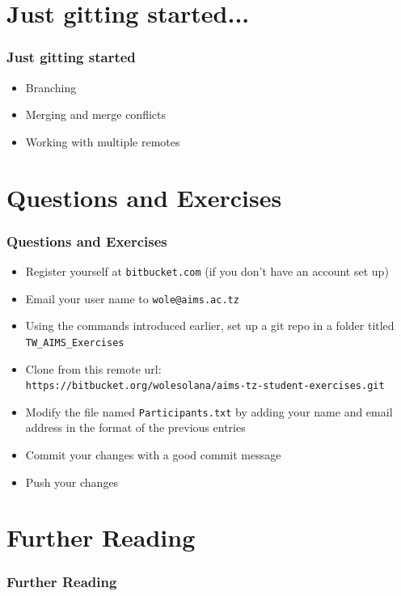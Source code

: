 \documentclass[10pt,t,sans,mathsans,xcolor=dvipsnames]{beamer}
\begin{document}
\section{Just gitting started...}
\begin{frame}[fragile]%
\frametitle{Just gitting started}
\pause
\begin{itemize}[<+->]
\item Branching
\item Merging and merge conflicts
\item Working with multiple remotes
\end{itemize}
\end{frame}
\section{Questions and Exercises}
\begin{frame}[fragile]
\frametitle{Questions and Exercises}
\pause
\begin{itemize}[<+->]
\item Register yourself at \texttt{bitbucket.com} (if you don't have an account set up)
\item Email your user name to \texttt{wole@aims.ac.tz}
\item Using the commands introduced earlier, set up a git repo in a folder titled \texttt{TW\_AIMS\_Exercises}
\item Clone from this remote url:\\
\footnotesize{\texttt{https://bitbucket.org/wolesolana/aims-tz-student-exercises.git}}
\item Modify the file named \texttt{Participants.txt} by adding your name and email address in the format of the previous entries
\item Commit your changes with a good commit message
\item Push your changes
\end{itemize}
\end{frame}
\section{Further Reading}
\begin{frame}
\frametitle{Further Reading}


\end{frame}
\end{document}
